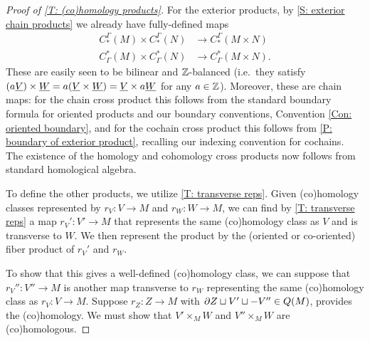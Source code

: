 \begin{proof}[Proof of \cref{T: (co)homology products}]
	For the exterior products, by \cref{S: exterior chain products} we already have fully-defined maps
	\begin{align*}C^\Gamma_*(M) \times C^\Gamma_*(N)& \to C^\Gamma_*(M \times N)\\ C_\Gamma^*(M) \times C_\Gamma^*(N)& \to C_\Gamma^*(M \times N).
	\end{align*}
	These are easily seen to be bilinear and $\mathbb{Z}$-balanced (i.e.\ they satisfy $(a\underline{V}) \times \underline{W} = a(\underline{V} \times \underline{W}) = \underline{V} \times a\underline{W}$ for any $a \in \mathbb{Z}$).
	Moreover, these are chain maps: for the chain cross product this follows from the standard boundary formula for oriented products and our boundary conventions, Convention \ref{Con: oriented boundary}, and for the cochain cross product this follows from \cref{P: boundary of exterior product}, recalling our indexing convention for cochains.
	The existence of the homology and cohomology cross products now follows from standard homological algebra.

	To define the other products, we utilize \cref{T: transverse reps}.
	Given (co)homology classes represented by $r_V \colon V \to M$ and $r_W \colon W \to M$, we can find by \cref{T: transverse reps} a map $r_V' \colon V' \to M$ that represents the same (co)homology class as $V$ and is transverse to $W$.
	We then represent the product by the (oriented or co-oriented) fiber product of $r_V'$ and $r_W$.

	To show that this gives a well-defined (co)homology class, we can suppose that $r_V'' \colon V'' \to M$ is another map transverse to $r_W$ representing the same (co)homology class as $r_V \colon V \to M$.
	Suppose $r_Z:Z \to M$ with $\partial Z \sqcup V' \sqcup -V'' \in Q(M)$, provides the (co)homology.
	We must show that $V' \times_M W$ and $V'' \times_M W$ are (co)homologous.


\end{proof}
